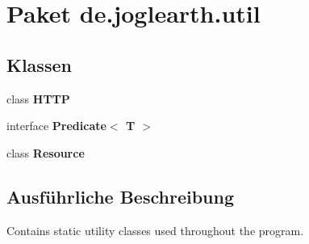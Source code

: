 \section{Paket de.\-joglearth.\-util}
\label{namespacede_1_1joglearth_1_1util}
\subsection*{Klassen}
\begin{DoxyCompactItemize}
\item 
class {\bf H\-T\-T\-P}
\item 
interface {\bf Predicate$<$ T $>$}
\item 
class {\bf Resource}
\end{DoxyCompactItemize}


\subsection{Ausführliche Beschreibung}
Contains static utility classes used throughout the program. 